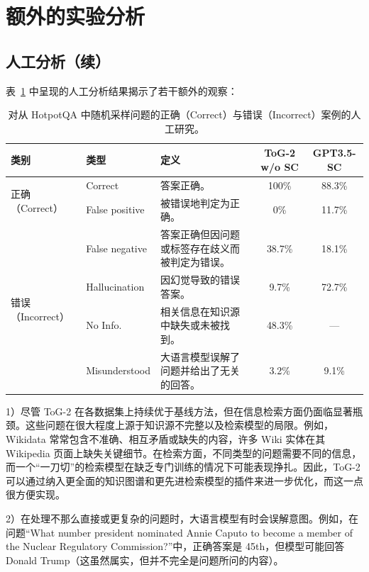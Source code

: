 \documentclass[11pt,UTF8,fontset=fandol]{ctexart}
\newcommand{\toctwo}{ToG-2}
\begin{document}
\section{额外的实验分析}

\subsection{人工分析（续）}

表~\ref{tab:5} 中呈现的人工分析结果揭示了若干额外的观察：

\begin{table}[H]\centering
\caption{对从 HotpotQA 中随机采样问题的正确（Correct）与错误（Incorrect）案例的人工研究。}
\setlength{\tabcolsep}{4pt}
\renewcommand{\arraystretch}{1.2}
\small
\begin{tabular}{lp{2.6cm}p{5.2cm}cc}
\toprule
类别 & 类型 & 定义 & \toctwo{} w/o SC & GPT3.5-SC\\
\midrule
\multirow{2}{*}{正确（Correct）} & Correct & 答案正确。 & 100\% & 88.3\%\\
 & False positive & 被错误地判定为正确。 & 0\% & 11.7\%\\
\midrule
\multirow{6}{*}{错误（Incorrect）} & False negative & 答案正确但因问题或标签存在歧义而被判定为错误。 & 38.7\% & 18.1\%\\
 & Hallucination & 因幻觉导致的错误答案。 & 9.7\% & 72.7\%\\
 & No Info. & 相关信息在知识源中缺失或未被找到。 & 48.3\% & ---\\
 & Misunderstood & 大语言模型误解了问题并给出了无关的回答。 & 3.2\% & 9.1\%\\
\bottomrule
\end{tabular}
\label{tab:5}
\end{table}

1）尽管 \toctwo{} 在各数据集上持续优于基线方法，但在信息检索方面仍面临显著瓶颈。这些问题在很大程度上源于知识源不完整以及检索模型的局限。例如，Wikidata 常常包含不准确、相互矛盾或缺失的内容，许多 Wiki 实体在其 Wikipedia 页面上缺失关键细节。在检索方面，不同类型的问题需要不同的信息，而一个“一刀切”的检索模型在缺乏专门训练的情况下可能表现挣扎。因此，\toctwo{} 可以通过纳入更全面的知识图谱和更先进检索模型的插件来进一步优化，而这一点很方便实现。

2）在处理不那么直接或更复杂的问题时，大语言模型有时会误解意图。例如，在问题“What number president nominated Annie Caputo to become a member of the Nuclear Regulatory Commission?”中，正确答案是 45th，但模型可能回答 Donald Trump（这虽然属实，但并不完全是问题所问的内容）。
\end{document}
